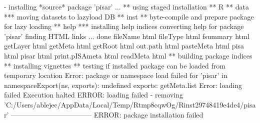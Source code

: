 \documentclass[a4paper,12pt]{article}\usepackage[]{graphicx}\usepackage[]{color}
\begin{document}
\begin{Schunk}
\begin{Soutput}
  
-  installing *source* package 'pisar' ...
   ** using staged installation
   ** R
   ** data
   *** moving datasets to lazyload DB
   ** inst
   ** byte-compile and prepare package for lazy loading
   ** help
   *** installing help indices
     converting help for package 'pisar'
       finding HTML links ... done
       fileName                                html  
       fileType                                html  
       fsummary                                html  
       getLayer                                html  
       getMeta                                 html  
       getRoot                                 html  
       out.path                                html  
       pasteMeta                               html  
       pisa                                    html  
       pisar                                   html  
       print.pISAmeta                          html  
       readMeta                                html  
   ** building package indices
   ** installing vignettes
   ** testing if installed package can be loaded from temporary location
   Error: package or namespace load failed for 'pisar' in namespaceExport(ns, exports):
    undefined exports: getMeta.list
   Error: loading failed
   Execution halted
   ERROR: loading failed
-  removing 'C:/Users/ablejec/AppData/Local/Temp/Rtmp8cqwOg/Rinst29748419e4de4/pisar'
         -----------------------------------
   ERROR: package installation failed



\end{Soutput}
\end{Schunk}
\end{document}
